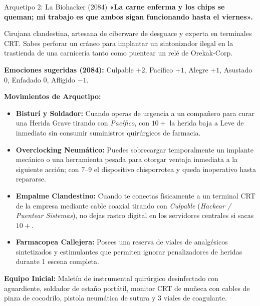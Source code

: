 \vspace{1em}

\begin{FichaArquetipo}{Arquetipo 2: La Biohacker (2084)}
\textbf{«La carne enferma y los chips se queman; mi trabajo es que ambos sigan funcionando hasta el viernes».}

Cirujana clandestina, artesana de ciberware de desguace y experta en terminales CRT. Sabes perforar un cráneo para implantar un sintonizador ilegal en la trastienda de una carnicería tanto como puentear un relé de Orekak-Corp.

\textbf{Emociones sugeridas (2084):} Culpable $+2$, Pacífico $+1$, Alegre $+1$, Asustado $0$, Enfadado $0$, Afligido $-1$.

\textbf{Movimientos de Arquetipo:}
\begin{itemize}
    \item \textbf{Bisturí y Soldador:} Cuando operas de urgencia a un compañero para curar una Herida Grave tirando con \textit{Pacífico}, con $10+$ la herida baja a Leve de inmediato sin consumir suministros quirúrgicos de farmacia.
    \item \textbf{Overclocking Neumático:} Puedes sobrecargar temporalmente un implante mecánico o una herramienta pesada para otorgar ventaja inmediata a la siguiente acción; con $7\text{--}9$ el dispositivo chisporrotea y queda inoperativo hasta repararse.
    \item \textbf{Empalme Clandestino:} Cuando te conectas físicamente a un terminal CRT de la empresa mediante cable coaxial tirando con \textit{Culpable} (\textit{Hackear / Puentear Sistemas}), no dejas rastro digital en los servidores centrales si sacas $10+$.
    \item \textbf{Farmacopea Callejera:} Posees una reserva de viales de analgésicos sintetizados y estimulantes que permiten ignorar penalizadores de heridas durante 1 escena completa.
\end{itemize}

\textbf{Equipo Inicial:} Maletín de instrumental quirúrgico desinfectado con aguardiente, soldador de estaño portátil, monitor CRT de muñeca con cables de pinza de cocodrilo, pistola neumática de sutura y 3 viales de coagulante.
\end{FichaArquetipo}

\vspace{1em}

